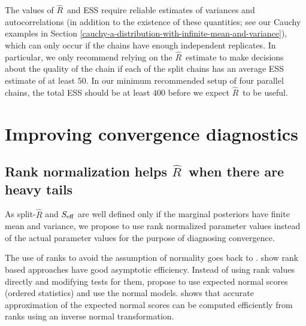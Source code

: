 \documentclass[american,]{article}
\DeclareMathOperator{\var}{var}
\newcommand{\Rhat}{$\widehat{R}$}
\theoremstyle{definition}
\begin{document}

The values of \Rhat\ and ESS require reliable estimates of variances and autocorrelations
(in addition to the existence of these quantities; see our Cauchy examples in Section 
\ref{cauchy-a-distribution-with-infinite-mean-and-variance}), which can
only occur if the chains have enough independent replicates. In particular, we only recommend 
relying on the \Rhat\ estimate to make decisions about the quality of the chain if each of the 
split chains has an average ESS estimate of at least $50$. In our minimum recommended setup of four
parallel chains, the total ESS should be at least $400$ before we expect  \Rhat\ to be useful.


\hypertarget{improving-convergence-diagnostics}{%
\section{Improving convergence
diagnostics}\label{improving-convergence-diagnostics}}

\hypertarget{rank-normalization}{%
\subsection{Rank normalization helps  \Rhat\ when there are heavy tails}\label{rank-normalization}}

As split-\(\widehat{R}\) and \(S_{\rm eff}\) are well defined
only if the marginal posteriors have finite mean and variance, we
propose to use rank normalized parameter values instead of the actual
parameter values for the purpose of diagnosing convergence.

The use of ranks to avoid the assumption of normality goes back to
\citet{Friedman:1937}. \citet{Chernoff+Savage:1958} show rank based
approaches have good asymptotic efficiency. Instead of using rank
values directly and modifying tests for them,
\citet{Fisher+Yates:1938} propose to use expected normal scores
(ordered statistics) and use the normal models. \citet{Blom:1958}
shows that accurate approximation of the expected normal scores can
be computed efficiently from ranks using an inverse normal transformation.
\end{document}

